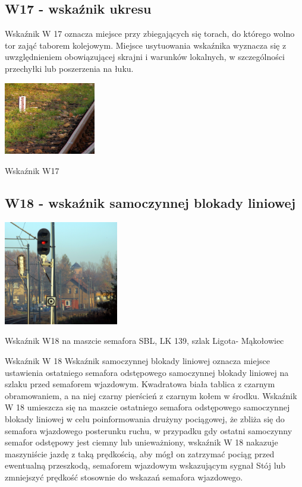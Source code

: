 \subsection{W17 - wskaźnik ukresu}

Wskaźnik W 17 oznacza miejsce przy zbiegających się torach, do którego wolno tor zająć taborem kolejowym. Miejsce usytuowania wskaźnika wyznacza się z uwzględnieniem obowiązującej skrajni i warunków lokalnych, w szczególności przechyłki lub poszerzenia na łuku.

	\begin{marginfigure}
		\includegraphics[width=4cm]{skryptkierownik-img/skryptkierownik-img016.jpg}
		\caption{Wskaźnik W17}
	\end{marginfigure}


\subsection{W18 - wskaźnik samoczynnej blokady liniowej}

	\begin{marginfigure}
	\includegraphics[width=5cm]{skryptkierownik-img/skryptkierownik-img017.jpg}
	\caption{Wskaźnik W18 na maszcie semafora SBL, LK 139, szlak Ligota- Mąkołowiec}
\end{marginfigure}
Wskaźnik W 18 {\textquotedbl}Wskaźnik samoczynnej blokady liniowej{\textquotedbl} oznacza miejsce ustawienia ostatniego semafora odstępowego samoczynnej blokady liniowej na szlaku przed semaforem wjazdowym. Kwadratowa biała tablica z czarnym obramowaniem, a na niej czarny pierścień z czarnym kołem w środku. Wskaźnik W 18 umieszcza się na maszcie ostatniego semafora odstępowego samoczynnej blokady liniowej w celu poinformowania drużyny pociągowej, że zbliża się do semafora wjazdowego posterunku ruchu, w przypadku gdy ostatni samoczynny semafor odstępowy jest ciemny lub
unieważniony, wskaźnik W 18 nakazuje maszyniście jazdę z taką prędkością, aby mógł on zatrzymać pociąg przed ewentualną przeszkodą, semaforem wjazdowym wskazującym sygnał {\textquotedbl}Stój{\textquotedbl} lub zmniejszyć prędkość stosownie do wskazań semafora wjazdowego.

